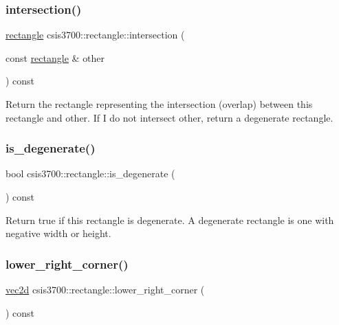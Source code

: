 \subsubsection{\texorpdfstring{intersection()}{intersection()}}
{\footnotesize\ttfamily \hyperlink{classcsis3700_1_1rectangle}{rectangle} csis3700\+::rectangle\+::intersection (\begin{DoxyParamCaption}\item[{const \hyperlink{classcsis3700_1_1rectangle}{rectangle} \&}]{other }\end{DoxyParamCaption}) const}

Return the rectangle representing the intersection (overlap) between this rectangle and other. If I do not intersect other, return a degenerate rectangle. \mbox{\label{classcsis3700_1_1rectangle_a8d897bc040bd296de7206a0576189dc6}} 
\subsubsection{\texorpdfstring{is\+\_\+degenerate()}{is\_degenerate()}}
{\footnotesize\ttfamily bool csis3700\+::rectangle\+::is\+\_\+degenerate (\begin{DoxyParamCaption}{ }\end{DoxyParamCaption}) const}

Return true if this rectangle is degenerate. A degenerate rectangle is one with negative width or height. \mbox{\label{classcsis3700_1_1rectangle_af54b1619b62550375df6a272b25c96b6}} 
\subsubsection{\texorpdfstring{lower\+\_\+right\+\_\+corner()}{lower\_right\_corner()}}
{\footnotesize\ttfamily \hyperlink{classcsis3700_1_1vec2d}{vec2d} csis3700\+::rectangle\+::lower\+\_\+right\+\_\+corner (\begin{DoxyParamCaption}{ }\end{DoxyParamCaption}) const}

